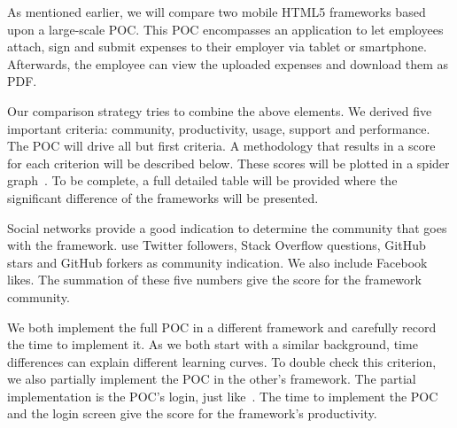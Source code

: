 \documentclass[a4paper]{artikel3}
\newcommand{\setspace}[0]{\vspace{2mm}}
\renewcommand{\paragraph}[1]{\setspace \noindent {\bf #1}  }
\begin{document}

As mentioned earlier,  we will compare two mobile HTML5 frameworks based upon a large-scale POC.  
This POC encompasses an application to let employees attach, sign and submit expenses to their employer via tablet or smartphone.
Afterwards, the employee can view the uploaded expenses and download them as PDF.

Our comparison strategy tries to combine the above elements.  
We derived five important criteria:  community,  productivity,  usage,  support and performance. 
The POC will drive all but first criteria.   
A methodology that results in a score for each criterion will be described below.  
These scores will be plotted in a spider graph~\cite{Few2005}.   
To be complete,  a full detailed table will be provided where the significant difference of the frameworks will be presented. 	

\paragraph{Community}
Social networks provide a good indication to determine the community that goes with the framework.  
\cite{Sarrafi2012a,Ayuso2012} use Twitter followers,  Stack Overflow questions,  GitHub stars and GitHub forkers as community indication.  
We also include Facebook likes.  The summation of these five numbers give the score for the framework community.  

\paragraph{Productivity}
We both implement the full POC in a different framework and carefully record the time to implement it.  
As we both start with a similar background,  time differences can explain different learning curves.  
To double check this criterion,  we also partially implement the POC in the other's framework.  
The partial implementation is the POC's login, just like~\cite{Burris}.   
The time to implement the POC and the login screen give the score for the framework's productivity.  
\end{document}
